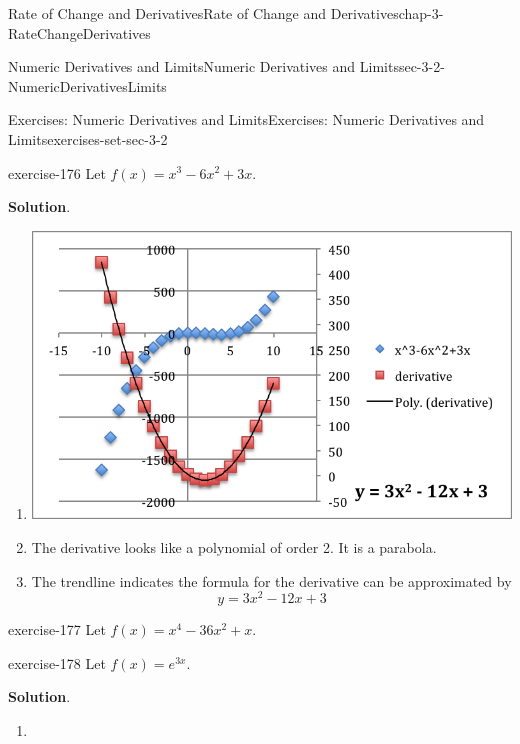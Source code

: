 \documentclass[oneside,10pt,]{book}
\numberwithin{equation}{section}
\begin{document}
\begin{chapterptx}{Rate of Change and Derivatives}{}{Rate of Change and Derivatives}{}{}{chap-3-RateChangeDerivatives}
\begin{sectionptx}{Numeric Derivatives and Limits}{}{Numeric Derivatives and Limits}{}{}{sec-3-2-NumericDerivativesLimits}
\begin{exercises-subsection-numberless}{Exercises: Numeric Derivatives and Limits}{}{Exercises: Numeric Derivatives and Limits}{}{}{exercises-set-sec-3-2}
\begin{exercisegroup}
\begin{divisionexerciseeg}{19}{}{}{exercise-176}
\hypertarget{p-1121}{}%
Let \(f(x)=x^3-6 x^2+3x\).%
\par\smallskip%
\noindent\textbf{Solution}.\hypertarget{solution-87}{}\quad%
\leavevmode%
\begin{enumerate}[label=(\alph*)]
\item\hypertarget{li-359}{}\hypertarget{p-1122}{}%
\leavevmode%
\begin{sidebyside}{1}{0.2}{0.2}{0}%
\begin{sbspanel}{0.6}%
\includegraphics[width=1\linewidth]{images/sec3-2-sol19a.png}
\end{sbspanel}%
\end{sidebyside}%
%
\item\hypertarget{li-360}{}\hypertarget{p-1123}{}%
The derivative looks like a polynomial of order 2. It is a parabola.%
\item\hypertarget{li-361}{}\hypertarget{p-1124}{}%
The trendline indicates the formula for the derivative can be approximated by%
%
\begin{equation*}
y=3x^2-12x+3
\end{equation*}
\end{enumerate}
\end{divisionexerciseeg}%
\begin{divisionexerciseeg}{20}{}{}{exercise-177}%
\hypertarget{p-1125}{}%
Let \(f(x)=x^4-36 x^2+x\).%
\end{divisionexerciseeg}%
\begin{divisionexerciseeg}{21}{}{}{exercise-178}%
\hypertarget{p-1126}{}%
Let \(f(x)=e^{3x}\).%
\par\smallskip%
\noindent\textbf{Solution}.\hypertarget{solution-88}{}\quad%
\leavevmode%
\begin{enumerate}[label=(\alph*)]
\item\hypertarget{li-362}{}\hypertarget{p-1127}{}%

\end{enumerate}
\end{divisionexerciseeg}
\end{exercisegroup}
\end{exercises-subsection-numberless}
\end{sectionptx}
\end{chapterptx}
\end{document}
